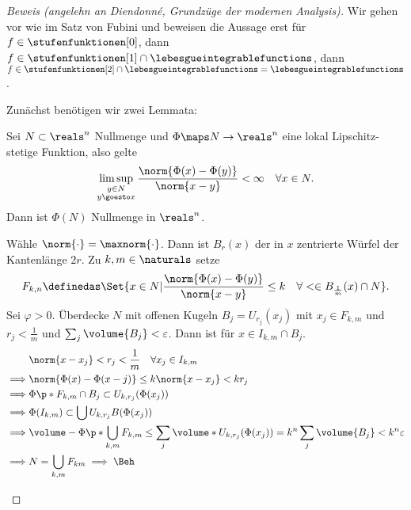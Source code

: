 \begin{proof}[Beweis (angelehn an Diendonné, Grundzüge der modernen Analysis)]
  Wir gehen vor wie im Satz von Fubini und beweisen die Aussage erst für \( f\in \stufenfunktionen[0] \), dann \( f\in \stufenfunktionen[1]\cap \lebesgueintegrablefunctions \), dann \( f\in \stufenfunktionen[2]\cap \lebesgueintegrablefunctions=\lebesgueintegrablefunctions \).
  
  Zunächst benötigen wir zwei Lemmata:
  \begin{lemma}\label{lipschitz_stetige_funktion_bild_von_nullmenge_ist_nullmenge}
    Sei \( N\subset \reals^n \) Nullmenge und \( \Phi\maps N\to \reals^n \) eine lokal Lipschitz-stetige Funktion, also gelte
    \begin{equation*}
      \limsup_{\substack{y\in N\\ y\goesto x}}\frac{\norm{\Phi(x)-\Phi(y)}}{\norm{x-y}}<\infty\quad \forall x\in N.
    \end{equation*}
    Dann ist \( \Phi(N) \) Nullmenge in \( \reals^n \).
  \end{lemma}
  \begin{subproof}
    Wähle \( \norm{\cdot}=\maxnorm{\cdot} \). Dann ist \( B_r(x) \) der in \( x \) zentrierte Würfel der Kantenlänge \( 2r \). Zu \( k, m\in \naturals \) setze
    \begin{equation*}
      F_{k,n}\definedas \Set{x\in N|\frac{\norm{\Phi(x)-\Phi(y)}}{\norm{x-y}}\leq k\quad \forall <\in B_{\frac{1}{m}}(x)\cap N}.
    \end{equation*}
    Sei \( \varphi>0 \). Überdecke \( N \) mit offenen Kugeln \( B_j=U_{r_j}(x_j) \) mit \( x_j\in F_{k,m} \) und \( r_j<\frac{1}{m} \) und \( \sum_{j}\volume{B_j}<\varepsilon \). Dann ist für \( x\in I_{k,m}\cap B_j \).
    \begin{align*}
      &\norm{x-x_j}<r_j<\frac{1}{m}\quad \forall x_j\in I_{k,m}\\
      \implies &\norm{\Phi(x)-\Phi(x-j)}\leq k\norm{x-x_j}<k r_j\\
      \implies &\Phi\p*{F_{k,m}\cap B_j}\subset U_{k,r_j}(\Phi(x_j))\\
      \implies &\Phi(I_{k,m})\subset \bigcup U_{k,r_j} B(\Phi(x_j))\\
      \implies &\volume-{\Phi\p*{\bigcup_{k,m}F_{k,m}}}\leq \sum_{j}\volume*{U_{k,r_j}(\Phi(x_j))}=k^n \sum_{j}\volume{B_j}<k^n \varepsilon\\
      \implies &N=\bigcup_{k,m}F_{km}\implies \text{\Beh}
    \end{align*}
    

\end{subproof}
\end{proof}

